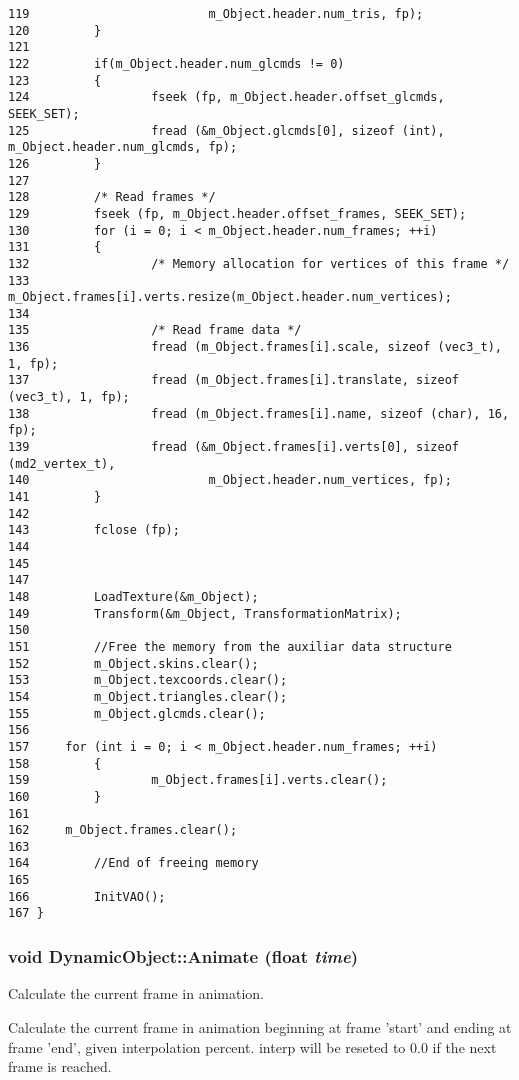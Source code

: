 \begin{Code}
\begin{verbatim}
119                         m_Object.header.num_tris, fp);
120         }
121 
122         if(m_Object.header.num_glcmds != 0)
123         {
124                 fseek (fp, m_Object.header.offset_glcmds, SEEK_SET);
125                 fread (&m_Object.glcmds[0], sizeof (int), m_Object.header.num_glcmds, fp);
126         }
127 
128         /* Read frames */
129         fseek (fp, m_Object.header.offset_frames, SEEK_SET);
130         for (i = 0; i < m_Object.header.num_frames; ++i)
131         {
132                 /* Memory allocation for vertices of this frame */
133                 m_Object.frames[i].verts.resize(m_Object.header.num_vertices);
134 
135                 /* Read frame data */
136                 fread (m_Object.frames[i].scale, sizeof (vec3_t), 1, fp);
137                 fread (m_Object.frames[i].translate, sizeof (vec3_t), 1, fp);
138                 fread (m_Object.frames[i].name, sizeof (char), 16, fp);
139                 fread (&m_Object.frames[i].verts[0], sizeof (md2_vertex_t),
140                         m_Object.header.num_vertices, fp);
141         }
142 
143         fclose (fp);
144 
145 
147 
148         LoadTexture(&m_Object);
149         Transform(&m_Object, TransformationMatrix);
150         
151         //Free the memory from the auxiliar data structure
152         m_Object.skins.clear();
153         m_Object.texcoords.clear();
154         m_Object.triangles.clear();
155         m_Object.glcmds.clear();
156  
157     for (int i = 0; i < m_Object.header.num_frames; ++i)
158         {
159                 m_Object.frames[i].verts.clear();
160         }
161 
162     m_Object.frames.clear();
163 
164         //End of freeing memory
165         
166         InitVAO();
167 }
\end{verbatim}
\end{Code}


\hypertarget{class_dynamic_object_c22d80000f1cb3aeb9837224e54f23a3}{
\subsubsection[Animate]{\setlength{\rightskip}{0pt plus 5cm}void DynamicObject::Animate (float {\em time})}}
\label{class_dynamic_object_c22d80000f1cb3aeb9837224e54f23a3}


Calculate the current frame in animation. 

Calculate the current frame in animation beginning at frame 'start' and ending at frame 'end', given interpolation percent. interp will be reseted to 0.0 if the next frame is reached.

